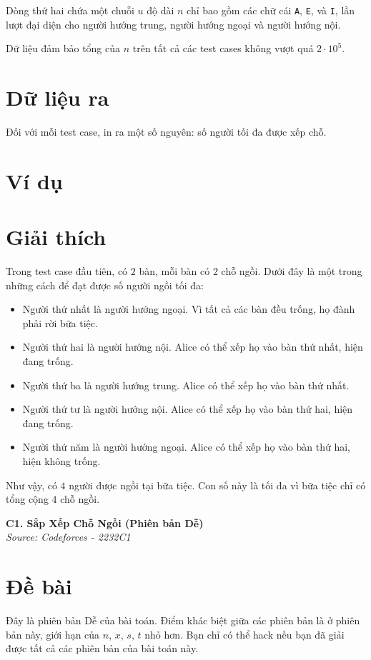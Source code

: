\documentclass[11pt]{article}
\newcommand{\problem}[2]{
    \begin{problembox}
    \begin{center}
        \Large \textbf{#1} \\
        \vspace{0.2cm}
        \small \textit{Source: #2}
    \end{center}
    \end{problembox}
}
\begin{document}
Dòng thứ hai chứa một chuỗi $u$ độ dài $n$ chỉ bao gồm các chữ cái \texttt{A}, \texttt{E}, và \texttt{I}, lần lượt đại diện cho người hướng trung, người hướng ngoại và người hướng nội.

Dữ liệu đảm bảo tổng của $n$ trên tất cả các test cases không vượt quá $2 \cdot 10^5$.

\section*{Dữ liệu ra}
Đối với mỗi test case, in ra một số nguyên: số người tối đa được xếp chỗ.

\section*{Ví dụ}
\begin{example}
\begin{exmp}
\end{exmp}
\end{example}

\section*{Giải thích}
Trong test case đầu tiên, có $2$ bàn, mỗi bàn có $2$ chỗ ngồi. Dưới đây là một trong những cách để đạt được số người ngồi tối đa:
\begin{itemize}
    \item Người thứ nhất là người hướng ngoại. Vì tất cả các bàn đều trống, họ đành phải rời bữa tiệc.
    \item Người thứ hai là người hướng nội. Alice có thể xếp họ vào bàn thứ nhất, hiện đang trống.
    \item Người thứ ba là người hướng trung. Alice có thể xếp họ vào bàn thứ nhất.
    \item Người thứ tư là người hướng nội. Alice có thể xếp họ vào bàn thứ hai, hiện đang trống.
    \item Người thứ năm là người hướng ngoại. Alice có thể xếp họ vào bàn thứ hai, hiện không trống.
\end{itemize}
Như vậy, có $4$ người được ngồi tại bữa tiệc. Con số này là tối đa vì bữa tiệc chỉ có tổng cộng $4$ chỗ ngồi.

\newpage
\problem{C1. Sắp Xếp Chỗ Ngồi (Phiên bản Dễ)}{Codeforces - 2232C1}

\section*{Đề bài}
Đây là phiên bản Dễ của bài toán. Điểm khác biệt giữa các phiên bản là ở phiên bản này, giới hạn của $n$, $x$, $s$, $t$ nhỏ hơn. Bạn chỉ có thể hack nếu bạn đã giải được tất cả các phiên bản của bài toán này.
\end{document}
